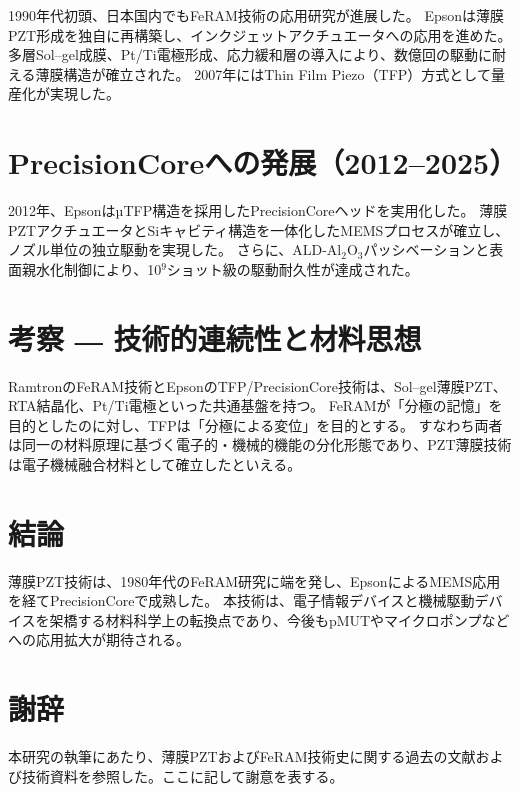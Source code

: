 \documentclass[conference]{IEEEtran}
\begin{document}
1990年代初頭、日本国内でもFeRAM技術の応用研究が進展した。
Epsonは薄膜PZT形成を独自に再構築し、インクジェットアクチュエータへの応用を進めた。
多層Sol–gel成膜、Pt/Ti電極形成、応力緩和層の導入により、数億回の駆動に耐える薄膜構造が確立された。
2007年にはThin Film Piezo（TFP）方式として量産化が実現した。

\section{PrecisionCoreへの発展（2012–2025）}

2012年、EpsonはµTFP構造を採用したPrecisionCoreヘッドを実用化した。
薄膜PZTアクチュエータとSiキャビティ構造を一体化したMEMSプロセスが確立し、ノズル単位の独立駆動を実現した。
さらに、ALD-Al$_2$O$_3$パッシベーションと表面親水化制御により、10$^9$ショット級の駆動耐久性が達成された。

\section{考察 ― 技術的連続性と材料思想}

RamtronのFeRAM技術とEpsonのTFP/PrecisionCore技術は、Sol–gel薄膜PZT、RTA結晶化、Pt/Ti電極といった共通基盤を持つ。
FeRAMが「分極の記憶」を目的としたのに対し、TFPは「分極による変位」を目的とする。
すなわち両者は同一の材料原理に基づく電子的・機械的機能の分化形態であり、PZT薄膜技術は電子機械融合材料として確立したといえる。

\section{結論}

薄膜PZT技術は、1980年代のFeRAM研究に端を発し、EpsonによるMEMS応用を経てPrecisionCoreで成熟した。
本技術は、電子情報デバイスと機械駆動デバイスを架橋する材料科学上の転換点であり、今後もpMUTやマイクロポンプなどへの応用拡大が期待される。

\section*{謝辞}
本研究の執筆にあたり、薄膜PZTおよびFeRAM技術史に関する過去の文献および技術資料を参照した。ここに記して謝意を表する。

\end{document}
